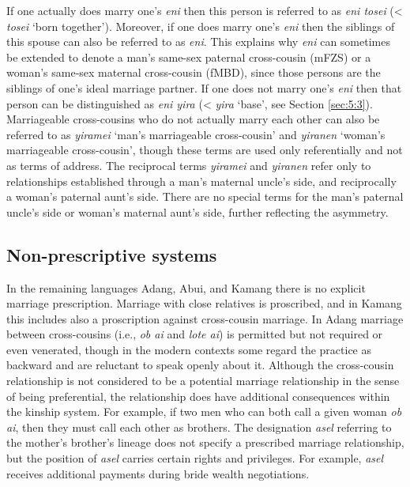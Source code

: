 If one actually does marry one's \textit{eni} then this person is referred to as \textit{eni tosei} ({\textless} \textit{tosei} `born together'). Moreover, if one does marry one's \textit{eni} then the siblings of this spouse can also be referred to as \textit{eni}. This explains why \textit{eni} can sometimes be extended to denote a man's same-sex paternal cross-cousin (mFZS) or a woman's same-sex maternal cross-cousin (fMBD), since those persons are the siblings of one's ideal marriage partner. If one does not marry one's \textit{eni} then that person can be distinguished as \textit{eni yira} ({\textless} \textit{yira} `base', see Section \ref{sec:5:3}). Marriageable cross-cousins who do not actually marry each other can also be referred to as \textit{yiramei} `man's marriageable cross-cousin' and \textit{yiranen} `woman's marriageable cross-cousin', though these terms are used only referentially and not as terms of address. The reciprocal terms \textit{yiramei} and \textit{yiranen} refer only to relationships established through a man's maternal uncle's side, and reciprocally a woman's paternal aunt's side. There are no special terms for the man's paternal uncle's side or woman's maternal aunt's side, further reflecting the asymmetry. 

\subsection{Non-prescriptive systems}
In the remaining languages Adang, Abui, and Kamang there is no explicit marriage prescription. Marriage with close relatives is proscribed, and in Kamang this includes also a proscription against cross-cousin marriage. In Adang marriage between cross-cousins (i.e., \textit{ob ai} and \textit{lote ai}) is permitted but not required or even venerated, though in the modern contexts some regard the practice as backward and are reluctant to speak openly about it. Although the cross-cousin relationship is not considered to be a potential marriage relationship in the sense of being preferential, the relationship does have additional consequences within the kinship system. For example, if two men who can both call a given woman \textit{ob ai}, then they must call each other as brothers. The designation \textit{asel} referring to the mother's brother's lineage does not specify a prescribed marriage relationship, but the position of \textit{asel} carries certain rights and privileges. For example, \textit{asel} receives additional payments during bride wealth negotiations. 

